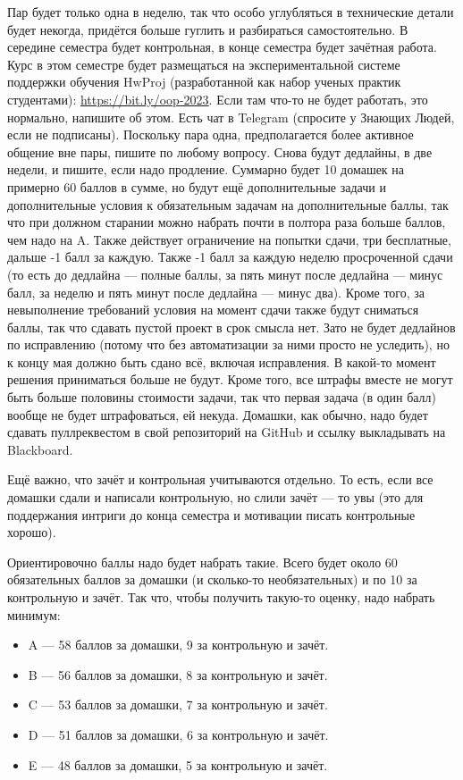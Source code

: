 \documentclass{../../text-style}
\begin{document}
Пар будет только одна в неделю, так что особо углубляться в технические детали будет некогда, придётся больше гуглить и разбираться самостоятельно. В середине семестра будет контрольная, в конце семестра будет зачётная работа. Курс в этом семестре будет размещаться на экспериментальной системе поддержки обучения HwProj (разработанной как набор ученых практик студентами): \url{https://bit.ly/oop-2023}. Если там что-то не будет работать, это нормально, напишите об этом. Есть чат в Telegram (спросите у Знающих Людей, если не подписаны). Поскольку пара одна, предполагается более активное общение вне пары, пишите по любому вопросу. Снова будут дедлайны, в две недели, и пишите, если надо продление. Суммарно будет 10 домашек на примерно 60 баллов в сумме, но будут ещё дополнительные задачи и дополнительные условия к обязательным задачам на дополнительные баллы, так что при должном старании можно набрать почти в полтора раза больше баллов, чем надо на A. Также действует ограничение на попытки сдачи, три бесплатные, дальше -1 балл за каждую. Также -1 балл за каждую неделю просроченной сдачи (то есть до дедлайна --- полные баллы, за пять минут после дедлайна --- минус балл, за неделю и пять минут после дедлайна --- минус два). Кроме того, за невыполнение требований условия на момент сдачи также будут сниматься баллы, так что сдавать пустой проект в срок смысла нет. Зато не будет дедлайнов по исправлению (потому что без автоматизации за ними просто не уследить), но к концу мая должно быть сдано всё, включая исправления. В какой-то момент решения приниматься больше не будут. Кроме того, все штрафы вместе не могут быть больше половины стоимости задачи, так что первая задача (в один балл) вообще не будет штрафоваться, ей некуда. Домашки, как обычно, надо будет сдавать пуллреквестом в свой репозиторий на GitHub и ссылку выкладывать на Blackboard.

Ещё важно, что зачёт и контрольная учитываются отдельно. То есть, если все домашки сдали и написали контрольную, но слили зачёт --- то увы (это для поддержания интриги до конца семестра и мотивации писать контрольные хорошо).

Ориентировочно баллы надо будет набрать такие. Всего будет около 60 обязательных баллов за домашки (и сколько-то необязательных) и по 10 за контрольную и зачёт. Так что, чтобы получить такую-то оценку, надо набрать минимум:
\begin{itemize}
    \item A --- 58 баллов за домашки, 9 за контрольную и зачёт.
    \item B --- 56 баллов за домашки, 8 за контрольную и зачёт.
    \item C --- 53 баллов за домашки, 7 за контрольную и зачёт.
    \item D --- 51 баллов за домашки, 6 за контрольную и зачёт.
    \item E --- 48 баллов за домашки, 5 за контрольную и зачёт.
\end{itemize}
\end{document}
